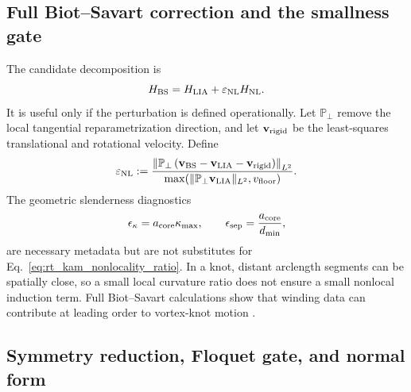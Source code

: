\subsection{Full Biot--Savart correction and the smallness gate}
\label{subsec:rt_kam_biot_savart_perturbation}

The candidate decomposition is
\begin{equation}
    H_{\rm BS}
    =
    H_{\rm LIA}
    +
    \varepsilon_{\rm NL}H_{\rm NL}.
    \label{eq:rt_kam_lia_full_bs_decomposition}
\end{equation}
It is useful only if the perturbation is defined operationally.  Let
\(\mathbb P_{\perp}\) remove the local tangential reparametrization direction,
and let \(\mathbf v_{\rm rigid}\) be the least-squares translational and
rotational velocity.  Define
\begin{equation}
    \varepsilon_{\rm NL}
    :=
    \frac{
    \left\lVert
    \mathbb P_{\perp}
    \left(
    \mathbf v_{\rm BS}
    -\mathbf v_{\rm LIA}
    -\mathbf v_{\rm rigid}
    \right)
    \right\rVert_{L^2}
    }{
    \max\!\left(
    \lVert\mathbb P_{\perp}\mathbf v_{\rm LIA}\rVert_{L^2},
    v_{\rm floor}
    \right)
    }.
    \label{eq:rt_kam_nonlocality_ratio}
\end{equation}
The geometric slenderness diagnostics
\begin{equation}
    \epsilon_{\kappa}
    =
    a_{\rm core}\kappa_{\max},
    \qquad
    \epsilon_{\rm sep}
    =
    \frac{a_{\rm core}}{d_{\min}},
    \label{eq:rt_kam_slenderness_diagnostics}
\end{equation}
are necessary metadata but are not substitutes for
Eq.~\eqref{eq:rt_kam_nonlocality_ratio}.  In a knot, distant arclength
segments can be spatially close, so a small local curvature ratio does not
ensure a small nonlocal induction term.  Full Biot--Savart calculations show
that winding data can contribute at leading order to vortex-knot motion
\cite{ObertiRicca2019WindingDynamics}.

\subsection{Symmetry reduction, Floquet gate, and normal form}
\label{subsec:rt_kam_floquet_normal_form}

